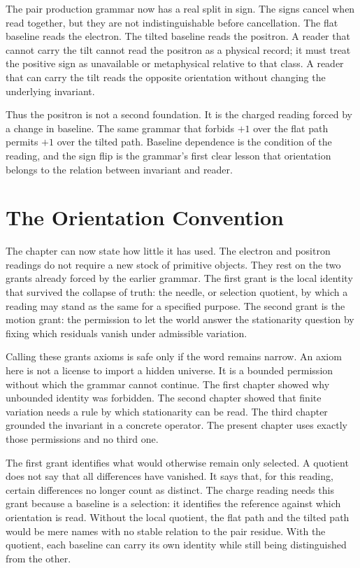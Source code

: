 The pair production grammar now has a real split in sign. The signs cancel
when read together, but they are not indistinguishable before cancellation.
The flat baseline reads the electron. The tilted baseline reads the
positron. A reader that cannot carry the tilt cannot read the positron as a
physical record; it must treat the positive sign as unavailable or
metaphysical relative to that class. A reader that can carry the tilt reads
the opposite orientation without changing the underlying invariant.

Thus the positron is not a second foundation. It is the charged reading
forced by a change in baseline. The same grammar that forbids \(+1\) over
the flat path permits \(+1\) over the tilted path. Baseline dependence is the
condition of the reading, and the sign flip is the grammar's first clear
lesson that orientation belongs to the relation between invariant and
reader.

\section{The Orientation Convention}

The chapter can now state how little it has used. The electron and positron
readings do not require a new stock of primitive objects. They rest on the
two grants already forced by the earlier grammar. The first grant is the
local identity that survived the collapse of truth: the needle, or selection
quotient, by which a reading may stand as the same for a specified purpose.
The second grant is the motion grant: the permission to let the world answer
the stationarity question by fixing which residuals vanish under admissible
variation.

Calling these grants axioms is safe only if the word remains narrow. An
axiom here is not a license to import a hidden universe. It is a bounded
permission without which the grammar cannot continue. The first chapter
showed why unbounded identity was forbidden. The second chapter showed that
finite variation needs a rule by which stationarity can be read. The third
chapter grounded the invariant in a concrete operator. The present chapter
uses exactly those permissions and no third one.

The first grant identifies what would otherwise remain only selected. A
quotient does not say that all differences have vanished. It says that, for
this reading, certain differences no longer count as distinct. The charge
reading needs this grant because a baseline is a selection: it identifies the
reference against which orientation is read. Without the local quotient, the
flat path and the tilted path would be mere names with no stable relation to
the pair residue. With the quotient, each baseline can carry its own
identity while still being distinguished from the other.

